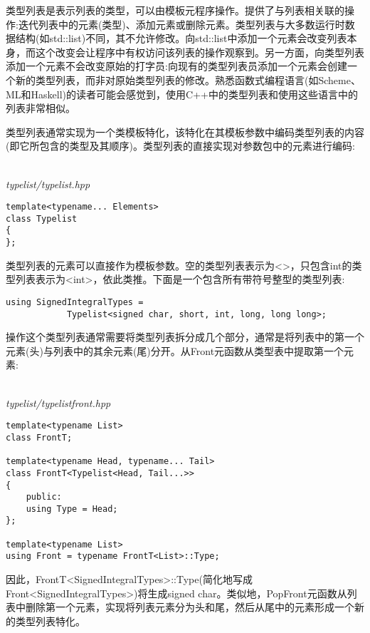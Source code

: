 类型列表是表示列表的类型，可以由模板元程序操作。提供了与列表相关联的操作:迭代列表中的元素(类型)、添加元素或删除元素。类型列表与大多数运行时数据结构(如std::list)不同，其不允许修改。向std::list中添加一个元素会改变列表本身，而这个改变会让程序中有权访问该列表的操作观察到。另一方面，向类型列表添加一个元素不会改变原始的打字员:向现有的类型列表员添加一个元素会创建一个新的类型列表，而非对原始类型列表的修改。熟悉函数式编程语言(如Scheme、ML和Haskell)的读者可能会感觉到，使用C++中的类型列表和使用这些语言中的列表非常相似。

类型列表通常实现为一个类模板特化，该特化在其模板参数中编码类型列表的内容(即它所包含的类型及其顺序)。类型列表的直接实现对参数包中的元素进行编码:

\hspace*{\fill} \\ %
\noindent
\textit{typelist/typelist.hpp}
\begin{lstlisting}[style=styleCXX]
template<typename... Elements>
class Typelist
{
};
\end{lstlisting}

类型列表的元素可以直接作为模板参数。空的类型列表表示为<>，只包含int的类型列表表示为<int>，依此类推。下面是一个包含所有带符号整型的类型列表:

\begin{lstlisting}[style=styleCXX]
using SignedIntegralTypes =
			Typelist<signed char, short, int, long, long long>;
\end{lstlisting}

操作这个类型列表通常需要将类型列表拆分成几个部分，通常是将列表中的第一个元素(头)与列表中的其余元素(尾)分开。从Front元函数从类型表中提取第一个元素:

\hspace*{\fill} \\ %
\noindent
\textit{typelist/typelistfront.hpp}
\begin{lstlisting}[style=styleCXX]
template<typename List>
class FrontT;

template<typename Head, typename... Tail>
class FrontT<Typelist<Head, Tail...>>
{
	public:
	using Type = Head;
};

template<typename List>
using Front = typename FrontT<List>::Type;
\end{lstlisting}

因此，FrontT<SignedIntegralTypes>::Type(简化地写成Front<SignedIntegralTypes>)将生成signed char。类似地，PopFront元函数从列表中删除第一个元素，实现将列表元素分为头和尾，然后从尾中的元素形成一个新的类型列表特化。

